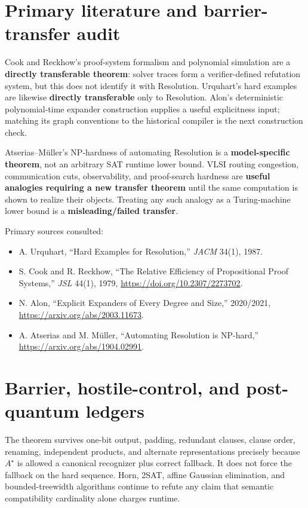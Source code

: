 \documentclass[11pt]{article}
\begin{document}
\section{Primary literature and barrier-transfer audit}

Cook and Reckhow's proof-system formalism and polynomial simulation are a
\textbf{directly transferable theorem}: solver traces form a verifier-defined
refutation system, but this does not identify it with Resolution.  Urquhart's
hard examples are likewise \textbf{directly transferable} only to Resolution.
Alon's deterministic polynomial-time expander construction supplies a useful
explicitness input; matching its graph conventions to the historical
compiler is the next construction check.

Atserias--M\"uller's NP-hardness of automating Resolution is a
\textbf{model-specific theorem}, not an arbitrary SAT runtime lower bound.
VLSI routing congestion, communication cuts, observability, and proof-search
hardness are \textbf{useful analogies requiring a new transfer theorem} until
the same computation is shown to realize their objects.  Treating any such
analogy as a Turing-machine lower bound is a \textbf{misleading/failed
transfer}.

Primary sources consulted:
\begin{itemize}
\item A. Urquhart, ``Hard Examples for Resolution,'' \emph{JACM} 34(1), 1987.
\item S. Cook and R. Reckhow, ``The Relative Efficiency of Propositional Proof
Systems,'' \emph{JSL} 44(1), 1979,
\url{https://doi.org/10.2307/2273702}.
\item N. Alon, ``Explicit Expanders of Every Degree and Size,'' 2020/2021,
\url{https://arxiv.org/abs/2003.11673}.
\item A. Atserias and M. M\"uller, ``Automating Resolution is NP-hard,''
\url{https://arxiv.org/abs/1904.02991}.
\end{itemize}

\section{Barrier, hostile-control, and post-quantum ledgers}

The theorem survives one-bit output, padding, redundant clauses, clause order,
renaming, independent products, and alternate representations precisely
because $A^\star$ is allowed a canonical recognizer plus correct fallback.
It does not force the fallback on the hard sequence.  Horn, 2SAT, affine
Gaussian elimination, and bounded-treewidth algorithms continue to refute any
claim that semantic compatibility cardinality alone charges runtime.
\end{document}
